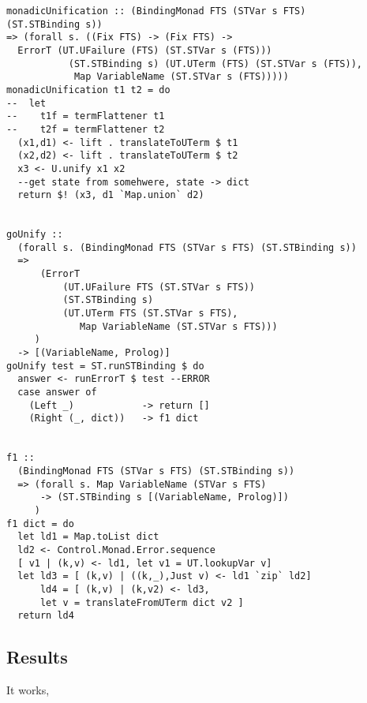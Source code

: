 \documentclass[thesis-solanki.tex]{subfiles}
\begin{document}
\begin{verbatim}
monadicUnification :: (BindingMonad FTS (STVar s FTS) 
(ST.STBinding s)) 
=> (forall s. ((Fix FTS) -> (Fix FTS) -> 
  ErrorT (UT.UFailure (FTS) (ST.STVar s (FTS)))
           (ST.STBinding s) (UT.UTerm (FTS) (ST.STVar s (FTS)),
            Map VariableName (ST.STVar s (FTS)))))
monadicUnification t1 t2 = do
--  let
--    t1f = termFlattener t1
--    t2f = termFlattener t2
  (x1,d1) <- lift . translateToUTerm $ t1
  (x2,d2) <- lift . translateToUTerm $ t2
  x3 <- U.unify x1 x2
  --get state from somehwere, state -> dict
  return $! (x3, d1 `Map.union` d2)


goUnify ::
  (forall s. (BindingMonad FTS (STVar s FTS) (ST.STBinding s))
  =>
      (ErrorT
          (UT.UFailure FTS (ST.STVar s FTS))
          (ST.STBinding s)
          (UT.UTerm FTS (ST.STVar s FTS),
             Map VariableName (ST.STVar s FTS)))
     )
  -> [(VariableName, Prolog)]
goUnify test = ST.runSTBinding $ do
  answer <- runErrorT $ test --ERROR
  case answer of
    (Left _)            -> return []
    (Right (_, dict))   -> f1 dict


f1 ::
  (BindingMonad FTS (STVar s FTS) (ST.STBinding s))
  => (forall s. Map VariableName (STVar s FTS)
      -> (ST.STBinding s [(VariableName, Prolog)])
     )
f1 dict = do
  let ld1 = Map.toList dict
  ld2 <- Control.Monad.Error.sequence 
  [ v1 | (k,v) <- ld1, let v1 = UT.lookupVar v]
  let ld3 = [ (k,v) | ((k,_),Just v) <- ld1 `zip` ld2]
      ld4 = [ (k,v) | (k,v2) <- ld3, 
      let v = translateFromUTerm dict v2 ]
  return ld4
\end{verbatim}



\subsection{Results}

It works,

 
\end{document}
